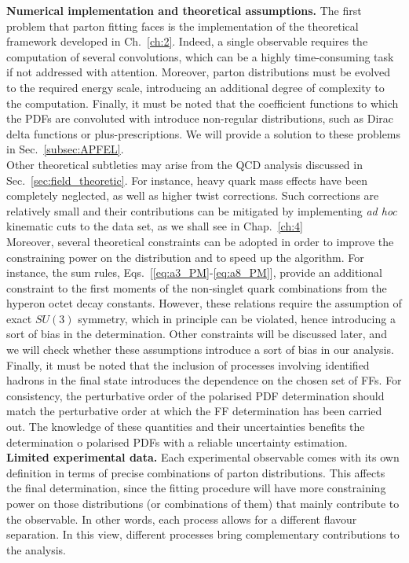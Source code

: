 \begingroup
\textbf{Numerical implementation and theoretical assumptions.} The first problem that parton fitting faces is the implementation of the theoretical framework developed in Ch.~\ref{ch:2}. Indeed, a single observable requires the computation of several convolutions, which can be a highly time-consuming task if not addressed with attention. Moreover, parton distributions must be evolved to the required energy scale, introducing an additional degree of complexity to the computation. Finally, it must be noted that the coefficient functions to which the PDFs are convoluted with introduce non-regular distributions, such as Dirac delta functions or plus-prescriptions. We will provide a solution to these problems in Sec.~\ref{subsec:APFEL}.
\\[6pt]
Other theoretical subtleties may arise from the QCD analysis discussed in Sec.~\ref{sec:field_theoretic}. For instance, heavy quark mass effects have been completely neglected, as well as higher twist corrections. Such corrections are relatively small and their contributions can be mitigated by implementing \textit{ad hoc} kinematic cuts to the data set, as we shall see in Chap.~\ref{ch:4}
\\[6pt]
Moreover, several theoretical constraints can be adopted in order to improve the constraining power on the distribution and to speed up the algorithm. For instance, the sum rules, Eqs.~[\ref{eq:a3_PM}-\ref{eq:a8_PM}], provide an additional constraint to the first moments of the non-singlet quark combinations from the hyperon octet decay constants. However, these relations require the assumption of exact $SU(3)$ symmetry, which in principle can be violated, hence introducing a sort of bias in the determination. Other constraints will be discussed later, and we will check whether these assumptions introduce a sort of bias in our analysis.
\\[6pt]
Finally, it must be noted that the inclusion of processes involving identified hadrons in the final state introduces the dependence on the chosen set of FFs. For consistency, the perturbative order of the polarised PDF determination should match the perturbative order at which the FF determination has been carried out. The knowledge of these quantities and their uncertainties benefits the determination o polarised PDFs with a reliable uncertainty estimation.
\endgroup
\\[10pt]
\begingroup
\textbf{Limited experimental data.} Each experimental observable comes with its own definition in terms of precise combinations of parton distributions. This affects the final determination, since the fitting procedure will have more constraining power on those distributions (or combinations of them) that mainly contribute to the observable. In other words, each process allows for a different flavour separation. In this view, different processes bring complementary contributions to the analysis.
